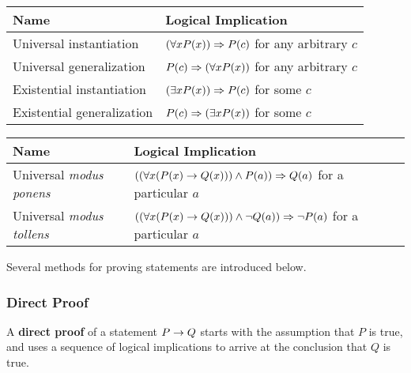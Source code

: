 \begin{theorem} \quad\par
    \begin{center}
        \begin{tabular}{ll}
            \textbf{Name} & \textbf{Logical Implication} \\
            \hline
            Universal instantiation & $(\forall x P(x)) \Rightarrow P(c)$ for any arbitrary $c$ \\
            Universal generalization & $P(c) \Rightarrow (\forall x P(x))$ for any arbitrary $c$ \\
            Existential instantiation & $(\exists x P(x)) \Rightarrow P(c)$ for some $c$ \\
            Existential generalization & $P(c) \Rightarrow (\exists x P(x))$ for some $c$ \\
        \end{tabular}
    \end{center}
\end{theorem}

\begin{theorem} \quad\par
    \begin{center}
        \begin{tabular}{ll}
            \textbf{Name} & \textbf{Logical Implication} \\
            \hline
            Universal \textit{modus ponens} & $((\forall x (P(x) \rightarrow Q(x))) \land P(a)) \Rightarrow Q(a)$ for a particular $a$ \\
            Universal \textit{modus tollens} & $((\forall x (P(x) \rightarrow Q(x))) \land \neg Q(a)) \Rightarrow \neg P(a)$ for a particular $a$
        \end{tabular}
    \end{center}
\end{theorem}

Several methods for proving statements are introduced below.

\subsubsection{Direct Proof}

A \textbf{direct proof} of a statement $P \rightarrow Q$ starts with the assumption that $P$
is true, and uses a sequence of logical implications to arrive at the conclusion that $Q$
is true.

